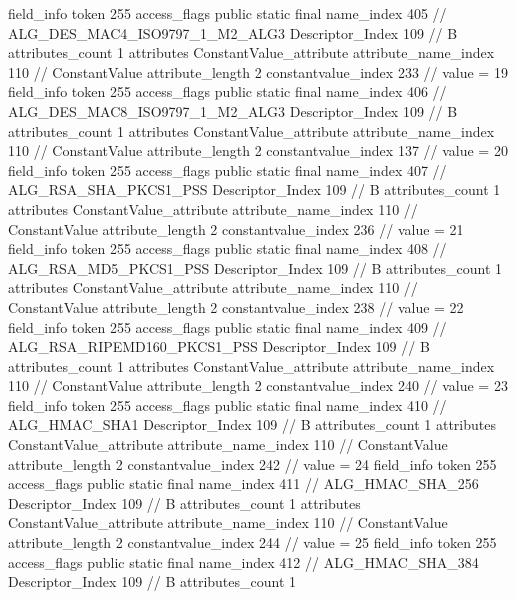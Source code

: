 {{{{{{{				}
				}
			}
			field_info {
				token	255
				access_flags	public static final
				name_index	405		// ALG_DES_MAC4_ISO9797_1_M2_ALG3
				Descriptor_Index	109		// B
				attributes_count	1
				attributes {
				ConstantValue_attribute {
					attribute_name_index	110		// ConstantValue
					attribute_length	2
					constantvalue_index	233		// value = 19
				}
				}
			}
			field_info {
				token	255
				access_flags	public static final
				name_index	406		// ALG_DES_MAC8_ISO9797_1_M2_ALG3
				Descriptor_Index	109		// B
				attributes_count	1
				attributes {
				ConstantValue_attribute {
					attribute_name_index	110		// ConstantValue
					attribute_length	2
					constantvalue_index	137		// value = 20
				}
				}
			}
			field_info {
				token	255
				access_flags	public static final
				name_index	407		// ALG_RSA_SHA_PKCS1_PSS
				Descriptor_Index	109		// B
				attributes_count	1
				attributes {
				ConstantValue_attribute {
					attribute_name_index	110		// ConstantValue
					attribute_length	2
					constantvalue_index	236		// value = 21
				}
				}
			}
			field_info {
				token	255
				access_flags	public static final
				name_index	408		// ALG_RSA_MD5_PKCS1_PSS
				Descriptor_Index	109		// B
				attributes_count	1
				attributes {
				ConstantValue_attribute {
					attribute_name_index	110		// ConstantValue
					attribute_length	2
					constantvalue_index	238		// value = 22
				}
				}
			}
			field_info {
				token	255
				access_flags	public static final
				name_index	409		// ALG_RSA_RIPEMD160_PKCS1_PSS
				Descriptor_Index	109		// B
				attributes_count	1
				attributes {
				ConstantValue_attribute {
					attribute_name_index	110		// ConstantValue
					attribute_length	2
					constantvalue_index	240		// value = 23
				}
				}
			}
			field_info {
				token	255
				access_flags	public static final
				name_index	410		// ALG_HMAC_SHA1
				Descriptor_Index	109		// B
				attributes_count	1
				attributes {
				ConstantValue_attribute {
					attribute_name_index	110		// ConstantValue
					attribute_length	2
					constantvalue_index	242		// value = 24
				}
				}
			}
			field_info {
				token	255
				access_flags	public static final
				name_index	411		// ALG_HMAC_SHA_256
				Descriptor_Index	109		// B
				attributes_count	1
				attributes {
				ConstantValue_attribute {
					attribute_name_index	110		// ConstantValue
					attribute_length	2
					constantvalue_index	244		// value = 25
				}
				}
			}
			field_info {
				token	255
				access_flags	public static final
				name_index	412		// ALG_HMAC_SHA_384
				Descriptor_Index	109		// B
				attributes_count	1
}}}}}
